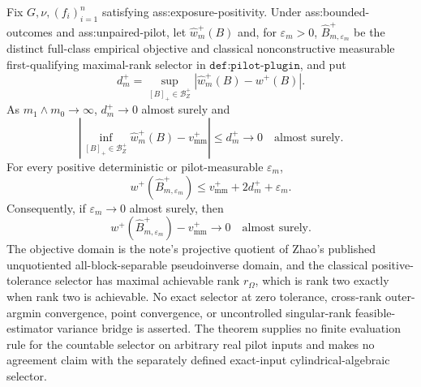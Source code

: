 Fix \(G,\nu,(f_i)_{i=1}^n\) satisfying ass:exposure-positivity.  Under ass:bounded-outcomes and ass:unpaired-pilot, let \(\widehat w_m^+(B)\) and, for \(\varepsilon_m>0\), \(\widehat B_{m,\varepsilon_m}^+\) be the distinct full-class empirical objective and classical nonconstructive measurable first-qualifying maximal-rank selector in \(\texttt{def:pilot-plugin}\), and put
\[
d_m^+=\sup_{[B]_+\in\mathcal B_Z^+}|\widehat w_m^+(B)-w^+(B)|.
\]
As \(m_1\wedge m_0\to\infty\), \(d_m^+\to0\) almost surely and
\[
\left|\inf_{[B]_+\in\mathcal B_Z^+}\widehat w_m^+(B)-v_{\mathrm{mm}}^+\right|
\le d_m^+\longrightarrow0
\quad\text{almost surely}.
\]
For every positive deterministic or pilot-measurable \(\varepsilon_m\),
\[
w^+(\widehat B_{m,\varepsilon_m}^+)
\le v_{\mathrm{mm}}^++2d_m^++\varepsilon_m.
\]
Consequently, if \(\varepsilon_m\to0\) almost surely, then
\[
w^+(\widehat B_{m,\varepsilon_m}^+)-v_{\mathrm{mm}}^+\longrightarrow0
\quad\text{almost surely}.
\]
The objective domain is the note's projective quotient of Zhao's published unquotiented all-block-separable pseudoinverse domain, and the classical positive-tolerance selector has maximal achievable rank \(r_\Omega\), which is rank two exactly when rank two is achievable.  No exact selector at zero tolerance, cross-rank outer-argmin convergence, point convergence, or uncontrolled singular-rank feasible-estimator variance bridge is asserted.  The theorem supplies no finite evaluation rule for the countable selector on arbitrary real pilot inputs and makes no agreement claim with the separately defined exact-input cylindrical-algebraic selector.